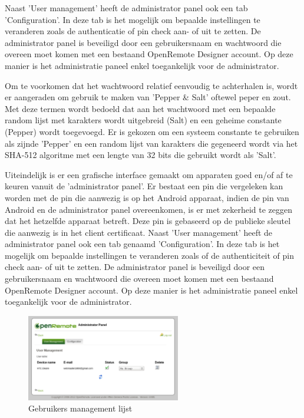 \documentclass[]{article}
\begin{document}
Naast 'User management' heeft de administrator panel ook een tab
'Configuration'. In deze tab is het mogelijk om bepaalde instellingen te
veranderen zoals de authenticatie of pin check aan- of uit te zetten.  De
administrator panel is beveiligd door een gebruikersnaam en wachtwoord die
overeen moet komen met een bestaand OpenRemote Designer account. Op deze manier
is het administratie paneel enkel toegankelijk voor de administrator.

Om te voorkomen dat het wachtwoord relatief eenvoudig te achterhalen is, wordt
er aangeraden om gebruik te maken van 'Pepper \& Salt' oftewel peper en zout. Met
deze termen wordt bedoeld dat aan het wachtwoord met een bepaalde random lijst
met karakters wordt uitgebreid  (Salt) en een geheime constante (Pepper) wordt
toegevoegd. Er is gekozen om een systeem constante te gebruiken als zijnde
'Pepper' en een random lijst van karakters die gegeneerd wordt via het SHA-512
algoritme met een lengte van 32 bits die gebruikt wordt als 'Salt'. 

Uiteindelijk is er een grafische interface gemaakt om apparaten goed en/of af te
keuren vanuit de 'administrator panel'. Er bestaat een pin die vergeleken kan
worden met de pin die aanwezig is op het Android apparaat, indien de pin van
Android en de administrator panel overeenkomen, is er met zekerheid te zeggen
dat het hetzelfde apparaat betreft. Deze pin is gebaseerd op de publieke
sleutel die aanwezig is in het client certificaat. Naast 'User management' heeft de
administrator panel ook een tab genaamd 'Configuration'. In deze tab is het
mogelijk om bepaalde instellingen te veranderen zoals of de authenticiteit of
pin check aan- of uit te zetten.  De administrator panel is beveiligd door een
gebruikersnaam en wachtwoord die overeen moet komen met een bestaand OpenRemote
Designer account. Op deze manier is het administratie paneel enkel toegankelijk
voor de administrator.

\begin{figure}[htpb]
   \begin{center}
     \includegraphics[width=0.6\textwidth]{userlist.pdf}
   \end{center}
   \label{userlist}
   \caption{Gebruikers management lijst}
\end{figure}
\end{document}
